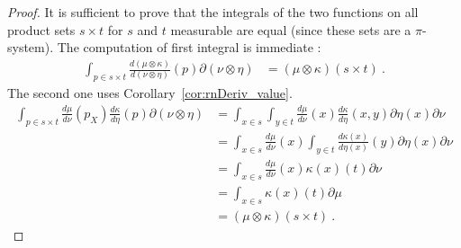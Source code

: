 \begin{proof}
It is sufficient to prove that the integrals of the two functions on all product sets $s \times t$ for $s$ and $t$ measurable are equal (since these sets are a $\pi$-system). The computation of first integral is immediate :
\begin{align*}
\int_{p \in s \times t}\frac{d (\mu \otimes \kappa)}{d (\nu \otimes \eta)}(p) \partial(\nu \otimes \eta)
&= (\mu \otimes \kappa)(s \times t)
\: .
\end{align*}
The second one uses Corollary~\ref{cor:rnDeriv_value}.
\begin{align*}
\int_{p \in s \times t}\frac{d\mu}{d\nu}(p_X) \frac{d \kappa}{d \eta}(p) \partial(\nu \otimes \eta)
&= \int_{x \in s} \int_{y \in t} \frac{d\mu}{d\nu}(x) \frac{d \kappa}{d \eta}(x,y) \partial\eta(x) \partial\nu
\\
&= \int_{x \in s} \frac{d\mu}{d\nu}(x) \int_{y \in t} \frac{d \kappa(x)}{d \eta(x)}(y) \partial\eta(x) \partial\nu
\\
&= \int_{x \in s} \frac{d\mu}{d\nu}(x) \kappa(x)(t) \partial\nu
\\
&= \int_{x \in s} \kappa(x)(t) \partial\mu
\\
&= (\mu \otimes \kappa)(s \times t)
\: .
\end{align*}
\end{proof}